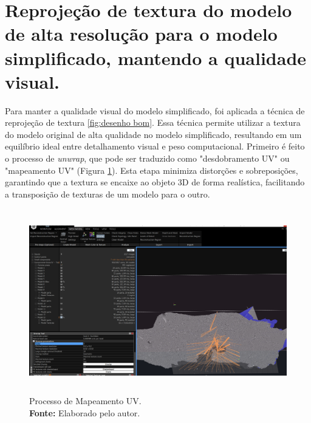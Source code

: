   \section{Reprojeção de textura do modelo de alta resolução para o modelo simplificado, mantendo a qualidade visual.} 
  
Para manter a qualidade visual do modelo simplificado, foi aplicada a técnica de reprojeção de textura \ref{fig:desenho bom}. Essa técnica permite utilizar a textura do modelo original de alta qualidade no modelo simplificado, resultando em um equilíbrio ideal entre detalhamento visual e peso computacional. Primeiro é feito o processo de \textit{unwrap}, que pode ser traduzido como "desdobramento UV" ou "mapeamento UV" (Figura \ref{fig:unwrap}). Esta etapa minimiza distorções e sobreposições, garantindo que a textura se encaixe ao objeto 3D de forma realística, facilitando a transposição de texturas de um modelo para o outro. 
\begin{figure}[H]
        \centering
        \includegraphics[height=8cm, keepaspectratio]{img/reality e fotogrametria processo/unwrap.png}
        \caption{Processo de Mapeamento UV. \\
            \textbf{Fonte:} Elaborado pelo autor.}
        \label{fig:unwrap}
\end{figure}

